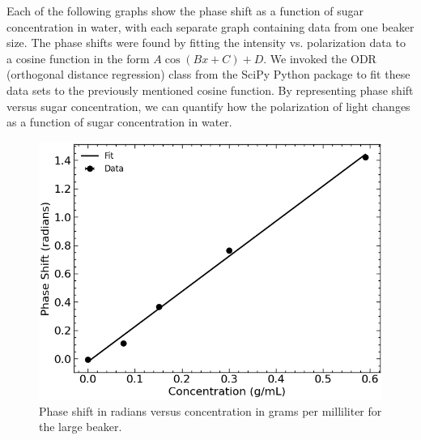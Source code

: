 \newpage
Each of the following graphs show the phase shift as a function of sugar concentration in water, with each separate graph containing data from one beaker size. 
The phase shifts were found by fitting the intensity vs. polarization data to a cosine function in the form $A\cos{\left(Bx+C\right)}+D$. We invoked the ODR (orthogonal distance regression) class from the SciPy Python package to fit these data sets to the previously mentioned cosine function. By representing phase shift versus sugar concentration, we can quantify how the polarization of light changes as a function of sugar concentration in water.

\begin{figure}[H]
    \begin{center}
        \includegraphics[width=\columnwidth]{../figures/large_beaker_phase_shifts.png}
    \end{center}
    \caption{Phase shift in radians versus concentration in grams per milliliter for the large beaker.}
    \label{fig:large_beaker_phase_shifts}
\end{figure}

